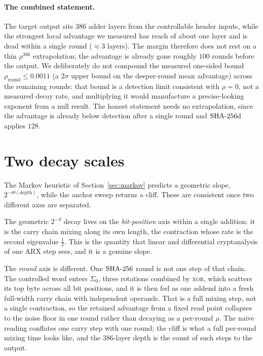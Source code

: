 \documentclass[11pt]{article}
\begin{document}
\paragraph{The combined statement.}
The target output sits $386$ adder layers from the controllable header
inputs, while the strongest local advantage we measured has reach of about
one layer and is dead within a single round ($\approx 3$ layers). The
margin therefore does not rest on a thin $\rho^{386}$ extrapolation; the
advantage is already gone roughly $100$ rounds before the output. We
deliberately do not compound the measured one-sided bound
$\rho_{\text{round}}\le 0.0011$ (a $2\sigma$ upper bound on the
deeper-round mean advantage) across the remaining rounds: that bound is a
detection limit consistent with $\rho=0$, not a measured decay rate, and
multiplying it would manufacture a precise-looking exponent from a null
result. The honest statement needs no extrapolation, since the advantage is
already below detection after a single round and $\mathrm{SHA\text{-}256d}$ applies $128$.

\section{Two decay scales}\label{sec:scales}

The Markov heuristic of Section~\ref{sec:markov} predicts a geometric
slope, $2^{-\Theta(\text{depth})}$, while the anchor sweep returns a cliff.
These are consistent once two different axes are separated.

The geometric $2^{-d}$ decay lives on the \emph{bit-position} axis within a
single addition: it is the carry chain mixing along its own length, the
contraction whose rate is the second eigenvalue $\tfrac12$. This is the
quantity that linear and differential cryptanalysis of one ARX step sees,
and it is a genuine slope.

The \emph{round} axis is different. One $\mathrm{SHA\text{-}256}$ round is not one step of that
chain. The controlled word enters $\Sigma_0$, three rotations combined by
\textsc{xor}, which scatters its top byte across all bit positions, and it
is then fed as one addend into a fresh full-width carry chain with
independent operands. That is a full mixing step, not a single contraction,
so the retained advantage from a fixed read point collapses to the noise
floor in one round rather than decaying as a per-round $\rho$. The naive
reading conflates one carry step with one round; the cliff is what a full
per-round mixing time looks like, and the $386$-layer depth is the count of
such steps to the output.
\end{document}
